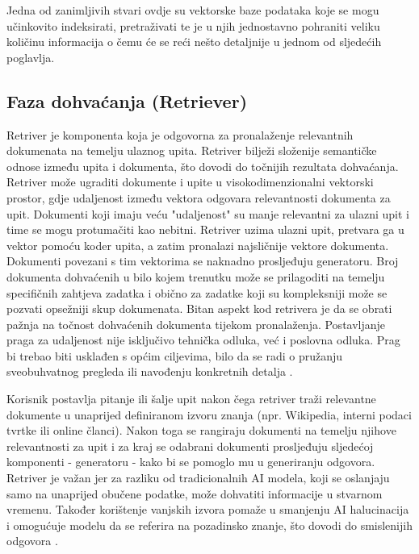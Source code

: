\documentclass[]{foi}
\begin{document}
 Jedna od zanimljivih stvari ovdje su vektorske baze podataka koje se mogu učinkovito indeksirati, pretraživati te je u njih jednostavno pohraniti veliku količinu informacija o čemu
 će se reći nešto detaljnije u jednom od sljedećih poglavlja.
 

\subsection{Faza dohvaćanja (Retriever)}

Retriver je komponenta koja je odgovorna za pronalaženje relevantnih dokumenata na temelju ulaznog upita. Retriver bilježi složenije semantičke odnose između upita i dokumenta, što dovodi do točnijih
rezultata dohvaćanja. Retriver može ugraditi dokumente i upite u visokodimenzionalni vektorski prostor, gdje udaljenost između vektora odgovara relevantnosti dokumenta za upit.
Dokumenti koji imaju veću "udaljenost" su manje relevantni za ulazni upit i time se mogu protumačiti kao nebitni. Retriver uzima ulazni upit, pretvara ga u vektor pomoću koder upita, a zatim
pronalazi najsličnije vektore dokumenta. Dokumenti povezani s tim vektorima se naknadno prosljeđuju generatoru. Broj dokumenta dohvaćenih u bilo kojem trenutku može se prilagoditi na temelju
specifičnih zahtjeva zadatka i obično za zadatke koji su kompleksniji može se pozvati opsežniji skup dokumenata.  Bitan aspekt kod retrivera je da se obrati pažnja na točnost dohvaćenih dokumenta
tijekom pronalaženja. Postavljanje praga za udaljenost nije isključivo tehnička odluka, već i poslovna odluka. Prag bi trebao biti usklađen s općim ciljevima, bilo da se radi o pružanju
sveobuhvatnog pregleda ili navođenju konkretnih detalja \cite{redis2025}. 

Korisnik postavlja pitanje ili šalje upit nakon čega retriver traži relevantne dokumente u unaprijed definiranom izvoru znanja (npr. Wikipedia, interni podaci tvrtke ili online članci).
Nakon toga se rangiraju dokumenti na temelju njihove relevantnosti za upit i za kraj se odabrani dokumenti prosljeđuju sljedećoj komponenti - generatoru - kako bi se pomoglo mu u generiranju odgovora.
Retriver je važan jer za razliku od tradicionalnih AI modela, koji se oslanjaju samo na unaprijed obučene podatke, može dohvatiti informacije u stvarnom vremenu. Također korištenje 
vanjskih izvora pomaže u smanjenju AI halucinacija i omogućuje modelu da se referira na pozadinsko znanje, što dovodi do smislenijih odgovora \cite{shaheryar2025}.
\end{document}
